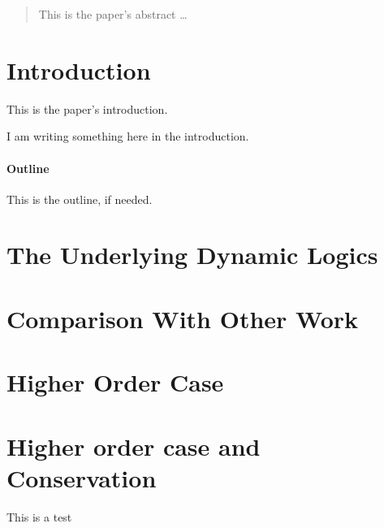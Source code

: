 \documentclass[a4paper,12pt]{article}
\begin{document}
\maketitle

\begin{abstract}
This is the paper's abstract \ldots
\end{abstract}

\section{Introduction}
This is the paper's introduction.

I am writing something here in the introduction.

\paragraph{Outline}
This is the outline, if needed.

\section{The Underlying Dynamic Logics}


\section{Comparison With Other Work}

\section{Higher Order Case}


\section{Higher order case and Conservation}

This is a test




\end{document}
